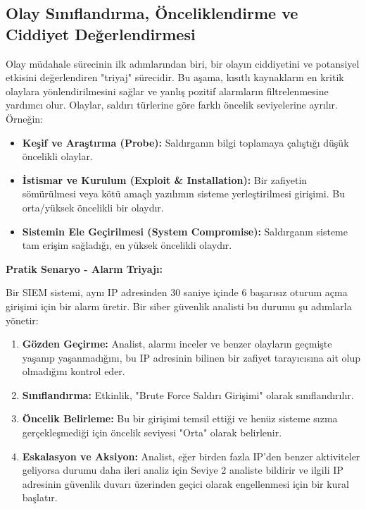 \begin{itemize}
\begin{itemize}
\subsection{Olay Sınıflandırma, Önceliklendirme ve Ciddiyet Değerlendirmesi}

Olay müdahale sürecinin ilk adımlarından biri, bir olayın ciddiyetini ve potansiyel etkisini değerlendiren "triyaj" sürecidir. Bu aşama, kısıtlı kaynakların en kritik olaylara yönlendirilmesini sağlar ve yanlış pozitif alarmların filtrelenmesine yardımcı olur. Olaylar, saldırı türlerine göre farklı öncelik seviyelerine ayrılır. Örneğin:

\begin{itemize}
    \item \textbf{Keşif ve Araştırma (Probe):} Saldırganın bilgi toplamaya çalıştığı düşük öncelikli olaylar.
    \item \textbf{İstismar ve Kurulum (Exploit \& Installation):} Bir zafiyetin sömürülmesi veya kötü amaçlı yazılımın sisteme yerleştirilmesi girişimi. Bu orta/yüksek öncelikli bir olaydır.
    \item \textbf{Sistemin Ele Geçirilmesi (System Compromise):} Saldırganın sisteme tam erişim sağladığı, en yüksek öncelikli olaydır.
\end{itemize}

\textbf{Pratik Senaryo - Alarm Triyajı:}

Bir SIEM sistemi, aynı IP adresinden 30 saniye içinde 6 başarısız oturum açma girişimi için bir alarm üretir. Bir siber güvenlik analisti bu durumu şu adımlarla yönetir:

\begin{enumerate}
    \item \textbf{Gözden Geçirme:} Analist, alarmı inceler ve benzer olayların geçmişte yaşanıp yaşanmadığını, bu IP adresinin bilinen bir zafiyet tarayıcısına ait olup olmadığını kontrol eder.
    \item \textbf{Sınıflandırma:} Etkinlik, "Brute Force Saldırı Girişimi" olarak sınıflandırılır.
    \item \textbf{Öncelik Belirleme:} Bu bir girişimi temsil ettiği ve henüz sisteme sızma gerçekleşmediği için öncelik seviyesi "Orta" olarak belirlenir.
    \item \textbf{Eskalasyon ve Aksiyon:} Analist, eğer birden fazla IP'den benzer aktiviteler geliyorsa durumu daha ileri analiz için Seviye 2 analiste bildirir ve ilgili IP adresinin güvenlik duvarı üzerinden geçici olarak engellenmesi için bir kural başlatır.
\end{enumerate}


\end{itemize}
\end{itemize}
